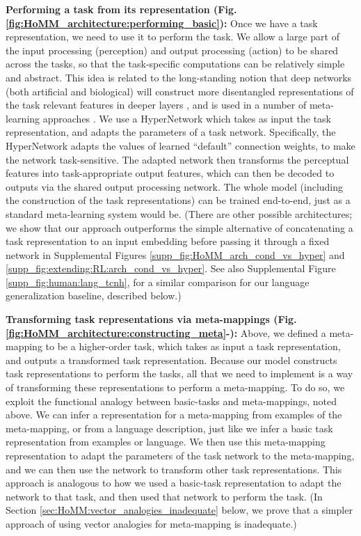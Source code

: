 \textbf{Performing a task from its representation (Fig. \ref{fig:HoMM_architecture:performing_basic}):} Once we have a task representation, we need to use it to perform the task. We allow a large part of the input processing (perception) and output processing (action) to be shared across the tasks, so that the task-specific computations can be relatively simple and abstract. This idea is related to the long-standing notion that deep networks (both artificial and biological) will construct more disentangled representations of the task relevant features in deeper layers \citep{Dicarlo2007, Erhan2010}, and is used in a number of meta-learning approaches \citep[e.g.]{Vinyals2016}. We use a HyperNetwork \citep{Ha2016} which takes as input the task representation, and adapts the parameters of a task network. Specifically, the HyperNetwork adapts the values of learned ``default'' connection weights, to make the network task-sensitive. The adapted network then transforms the perceptual features into task-appropriate output features, which can then be decoded to outputs via the shared output processing network. The whole model (including the construction of the task representations) can be trained end-to-end, just as a standard meta-learning system would be. (There are other possible architectures; we show that our approach outperforms the simple alternative of concatenating a task representation to an input embedding before passing it through a fixed network in Supplemental Figures \ref{supp_fig:HoMM_arch_cond_vs_hyper} and \ref{supp_fig:extending:RL:arch_cond_vs_hyper}. See also Supplemental Figure \ref{supp_fig:human:lang_tcnh}, for a similar comparison for our language generalization baseline, described below.) 

\textbf{Transforming task representations via meta-mappings (Fig. \ref{fig:HoMM_architecture:constructing_meta}-):} Above, we defined a meta-mapping to be a higher-order task, which takes as input a task representation, and outputs a transformed task representation. Because our model constructs task representations to perform the tasks, all that we need to implement is a way of transforming these representations to perform a meta-mapping. To do so, we exploit the functional analogy between basic-tasks and meta-mappings, noted above. We can infer a representation for a meta-mapping from examples of the meta-mapping, or from a language description, just like we infer a basic task representation from examples or language. We then use this meta-mapping representation to adapt the parameters of the task network to the meta-mapping, and we can then use the network to transform other task representations. This approach is analogous to how we used a basic-task representation to adapt the network to that task, and then used that network to perform the task. (In Section \ref{sec:HoMM:vector_analogies_inadequate} below, we prove that a simpler approach of using vector analogies for meta-mapping is inadequate.) 

